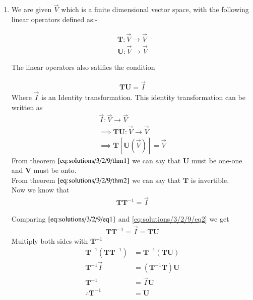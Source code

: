 	
	\begin{enumerate}
		\item We are given $\vec{V}$ which is a finite dimensional vector space, with the following linear operators defined as:-
		
		\begin{align}
			\mathbf{T} : \vec{V} \xrightarrow{} \vec{V} \\
			\mathbf{U} : \vec{V} \xrightarrow{} \vec{V}
		\end{align}
		
		The linear operators also satifies the condition
		
		\begin{align}
			\mathbf{T}\mathbf{U} = \vec{I} \label{eq:solutions/3/2/9/eq1}
		\end{align}
		Where $\vec{I}$ is an Identity transformation. This identity transformation can be written as 
		\begin{align}
			\vec{I} : \vec{V} \xrightarrow{} \vec{V} \\
			\implies \mathbf{TU} : \vec{V} \xrightarrow{} \vec{V}\\
			\implies \mathbf{T}\left[ \mathbf{U}\left(\vec{V}\right)\right] = \vec{V}
		\end{align}
		From theorem $\eqref{eq:solutions/3/2/9/thm1}$ we can say that $\mathbf{U}$ must be one-one and $\mathbf{V}$ must be onto.\\
		From theorem $\eqref{eq:solutions/3/2/9/thm2}$ we can say that $\mathbf{T}$ is invertible.\\
		
		Now we know that
		\begin{align}
			\mathbf{T}\mathbf{T}^{-1} = \vec{I} \label{eq:solutions/3/2/9/eq2}
		\end{align}
		
		Comparing $\eqref{eq:solutions/3/2/9/eq1}$ and \eqref{eq:solutions/3/2/9/eq2} we get
		\begin{align}
			\mathbf{T}\mathbf{T}^{-1} = \vec{I} = \mathbf{T}\mathbf{U}
		\end{align}
		Multiply both sides with $\mathbf{T}^{-1}$
		\begin{align}
			\mathbf{T}^{-1}\left(\mathbf{T}\mathbf{T}^{-1}\right) &= \mathbf{T}^{-1}\left(\mathbf{T}\mathbf{U}\right) \\
			\mathbf{T}^{-1}\vec{I} &= \left(\mathbf{T}^{-1}\mathbf{T}\right)\mathbf{U} \\
			\mathbf{T}^{-1} &= \vec{I}\mathbf{U}\\
			\therefore \mathbf{T}^{-1} &= \mathbf{U}
		\end{align}
		

\end{enumerate}
